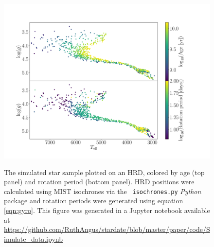 \begin{figure}
  \caption{
      The simulated star sample plotted on an HRD, colored by age
    (top panel) and rotation period (bottom panel).
    HRD positions were calculated using MIST isochrones via the {\tt
    isochrones.py} {\it Python} package and rotation periods were generated
    using equation \ref{eqn:gyro}.
    This figure was generated in a Jupyter notebook available at
    \url{https://github.com/RuthAngus/stardate/blob/master/paper/code/Simulate_data.ipynb}
}
  \centering
    \includegraphics[width=1\textwidth]{simulated_CMD}
\label{fig:CMD_age}
\end{figure}

